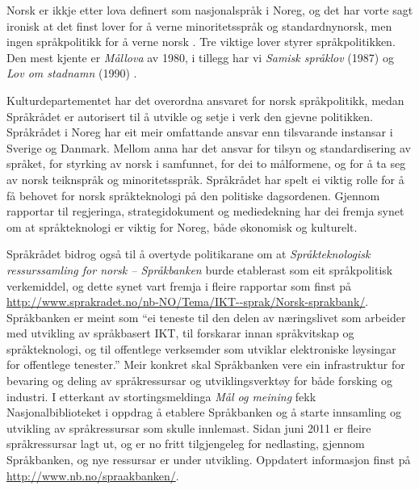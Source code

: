 \begin{multicols}{2}
Norsk er ikkje etter lova definert som nasjonalspråk i Noreg, og det har vorte sagt ironisk at det finst lover for å verne minoritetsspråk og standardnynorsk, men ingen språkpolitikk for å verne norsk \cite{nih:2005}. 
Tre viktige lover styrer språkpolitikken. Den mest kjente er \textit{Mållova} av 1980, i tillegg har vi \textit{Samisk språklov} (1987) og \textit{Lov om stadnamn} (1990) \cite{stm35:2008}.

Kulturdepartementet har det overordna ansvaret for norsk språkpolitikk, medan Språkrådet er autorisert til å utvikle og setje i verk den gjevne politikken. Språkrådet i Noreg har eit meir omfattande ansvar enn tilsvarande instansar i Sverige og Danmark. 
Mellom anna har det ansvar for tilsyn og standardisering av språket, for styrking av norsk i samfunnet, for dei to målformene, og for å ta seg av norsk teiknspråk og minoritetsspråk. 
Språkrådet har spelt ei viktig rolle for å få behovet for norsk språkteknologi på den politiske dagsordenen. 
Gjennom rapportar til regjeringa, strategidokument og mediedekning har dei fremja synet om at språkteknologi er viktig for Noreg, både økonomisk og kulturelt.


Språkrådet bidrog også til å overtyde politikarane om at \textit{Språkteknologisk ressurssamling for norsk – Språkbanken} burde etablerast som eit språkpolitisk verkemiddel, og dette synet vart fremja i fleire rapportar som finst på \url{http://www.sprakradet.no/nb-NO/Tema/IKT--sprak/Norsk-sprakbank/}.
Språkbanken er meint som ``ei teneste til den delen av næringslivet som arbeider med utvikling av språkbasert IKT, til forskarar innan språkvitskap og språkteknologi, og til offentlege verksemder som utviklar elektroniske løysingar for offentlege tenester.'' %
Meir konkret skal Språkbanken vere ein infrastruktur for bevaring og deling av språkressursar og utviklingsverktøy for både forsking og industri. 
I etterkant av stortingsmeldinga \textit{Mål og meining} \cite{stm35:2008} fekk Nasjonalbiblioteket i oppdrag å etablere Språkbanken og å starte innsamling og utvikling av språkressursar som skulle innlemast. 
Sidan juni 2011 er fleire språkressursar lagt ut, og er no fritt tilgjengeleg for nedlasting, gjennom Språkbanken, og nye ressursar er under utvikling.
Oppdatert informasjon finst på \url{http://www.nb.no/spraakbanken/}.


\end{multicols}
